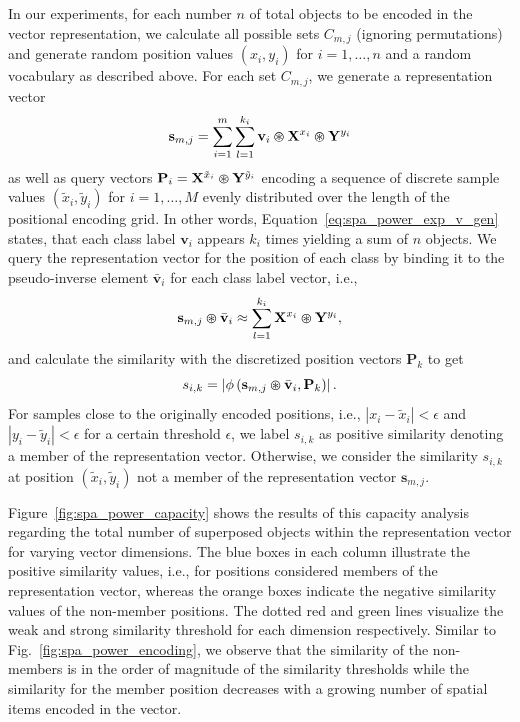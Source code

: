 In our experiments, for each number $n$ of total objects to be encoded in the vector representation, we calculate all possible sets $C_{m,j}$ (ignoring permutations) and generate random position values $ \left(x_{i}, y_{i}\right)$ for $i=1, \ldots, n$ and a random vocabulary as described above.
For each set $C_{m,j}$, we generate a representation vector 
\begin{equation}
\label{eq:spa_power_exp_v_gen}
\mathbf{s}_{m,j} = \sum\limits_{i=1}^{m} \sum\limits_{l=1}^{k_{i}} \mathbf{v}_{i} \varoast \mathbf{X}^{x_{i}} \varoast \mathbf{Y}^{y_{i}}
\end{equation}
as well as query vectors $ {\mathbf{P}}_{i} = \mathbf{X}^{\tilde{x}_{i}} \varoast \mathbf{Y}^{\tilde{y}_i} $ encoding a sequence of discrete sample values $ \left( \tilde{x}_{i}, \tilde{y}_{i} \right)$ for $i=1, \ldots, M$ evenly distributed over the length of the positional encoding grid.
In other words, Equation~\eqref{eq:spa_power_exp_v_gen} states, that each class label $ \mathbf{v}_{i}$ appears $k_{i}$ times yielding a sum of $n$ objects.
We query the representation vector for the position of each class by binding it to the pseudo-inverse element $ \bar{ \mathbf{v}}_{i}$ for each class label vector, i.e., 
\begin{equation}
\label{eq:spa_power_query}
\mathbf{s}_{m,j} \varoast \bar{ \mathbf{v}}_{i} \approx \sum\limits_{l=1}^{k_{i}} \mathbf{X}^{{x}_{i}} \varoast \mathbf{Y}^{{y}_i}, 
\end{equation}
and calculate the similarity with the discretized position vectors $ \mathbf{P}_{k}$ to get
\begin{equation}
\label{eq:text}
s_{i,k} = \left|\phi \left( \mathbf{s}_{m,j} \varoast \bar{ \mathbf{v}}_{i}, \mathbf{P}_{k}\right) \right|.
\end{equation}
For samples close to the originally encoded positions, i.e., $\left| x_{i} - \tilde{x}_{i}\right| < \epsilon$ and $\left| y_{i} - \tilde{y}_{i}\right| < \epsilon$ for a certain threshold $\epsilon$, we label $s_{i,k}$ as positive similarity denoting a member of the representation vector.
Otherwise, we consider the similarity $s_{i,k}$ at position $\left( \tilde{x}_{i}, \tilde{y}_{i} \right)$ not a member of the representation vector $ \mathbf{s}_{m,j}$.

Figure~\ref{fig:spa_power_capacity} shows the results of this capacity analysis regarding the total number of superposed objects within the representation vector for varying vector dimensions.
The blue boxes in each column illustrate the positive similarity values, i.e., for positions considered members of the representation vector, whereas the orange boxes indicate the negative similarity values of the non-member positions.
The dotted red and green lines visualize the weak and strong similarity threshold for each dimension respectively.
Similar to Fig.~\ref{fig:spa_power_encoding}, we observe that the similarity of the non-members is in the order of magnitude of the similarity thresholds while the similarity for the member position decreases with a growing number of spatial items encoded in the vector.

